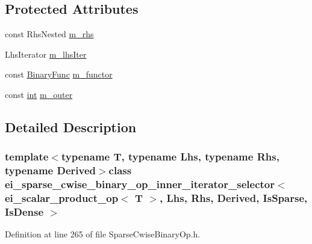 \subsection*{Protected Attributes}
\begin{DoxyCompactItemize}
\item 
const Rhs\-Nested \hyperlink{classei__sparse__cwise__binary__op__inner__iterator__selector_3_01ei__scalar__product__op_3_01_t68443256ad4d0dcd15264ea9d6adeadd_ad020918a7dc626d1b5b3e7e5b22258ca}{m\-\_\-rhs}
\item 
Lhs\-Iterator \hyperlink{classei__sparse__cwise__binary__op__inner__iterator__selector_3_01ei__scalar__product__op_3_01_t68443256ad4d0dcd15264ea9d6adeadd_afd41a7a55d5d3241b082042598efd490}{m\-\_\-lhs\-Iter}
\item 
const \hyperlink{structei__scalar__product__op}{Binary\-Func} \hyperlink{classei__sparse__cwise__binary__op__inner__iterator__selector_3_01ei__scalar__product__op_3_01_t68443256ad4d0dcd15264ea9d6adeadd_aabe33c4f50625a5f1f7d98a39a96e41a}{m\-\_\-functor}
\item 
const \hyperlink{ioapi_8h_a787fa3cf048117ba7123753c1e74fcd6}{int} \hyperlink{classei__sparse__cwise__binary__op__inner__iterator__selector_3_01ei__scalar__product__op_3_01_t68443256ad4d0dcd15264ea9d6adeadd_a009b4d4bef40f1cebd10dbc3efc8d36d}{m\-\_\-outer}
\end{DoxyCompactItemize}


\subsection{Detailed Description}
\subsubsection*{template$<$typename T, typename Lhs, typename Rhs, typename Derived$>$class ei\-\_\-sparse\-\_\-cwise\-\_\-binary\-\_\-op\-\_\-inner\-\_\-iterator\-\_\-selector$<$ ei\-\_\-scalar\-\_\-product\-\_\-op$<$ T $>$, Lhs, Rhs, Derived, Is\-Sparse, Is\-Dense $>$}



Definition at line 265 of file Sparse\-Cwise\-Binary\-Op.\-h.



